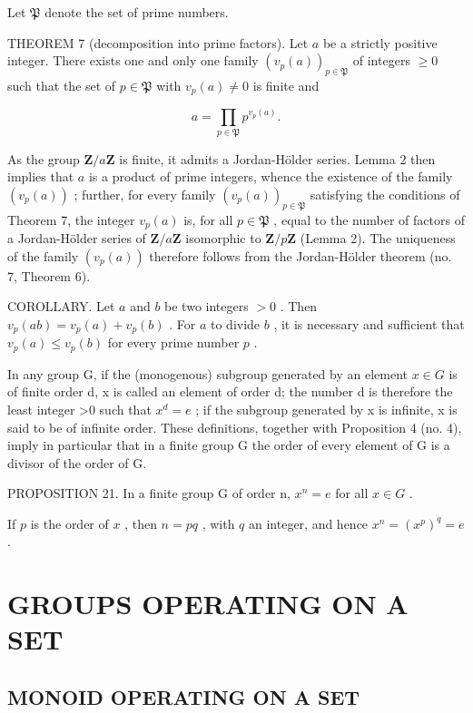 Let \(\mathfrak{P}\) denote the set of prime numbers.

THEOREM 7 (decomposition into prime factors). Let \(a\) be a strictly positive integer. There exists one and only one family \((v_{p}(a))_{p \in \mathfrak{P}}\) of integers \(\geqslant 0\) such that the set of \(p \in \mathfrak{P}\) with \(v_{p}(a) \neq 0\) is finite and

\[
a = \prod_ {p \in \mathfrak {P}} p ^ {v _ {p} (a)}.\tag{5}
\]

As the group \(\mathbf{Z}/a\mathbf{Z}\) is finite, it admits a Jordan-Hölder series. Lemma 2 then implies that \(a\) is a product of prime integers, whence the existence of the family \((v_{p}(a))\) ; further, for every family \((v_{p}(a))_{p\in\mathfrak{P}}\) satisfying the conditions of Theorem 7, the integer \(v_{p}(a)\) is, for all \(p\in\mathfrak{P}\) , equal to the number of factors of a Jordan-Hölder series of \(\mathbf{Z}/a\mathbf{Z}\) isomorphic to \(\mathbf{Z}/p\mathbf{Z}\) (Lemma 2). The uniqueness of the family \((v_{p}(a))\) therefore follows from the Jordan-Hölder theorem (no. 7, Theorem 6).

COROLLARY. Let \(a\) and \(b\) be two integers \(>0\) . Then \(v_{p}(ab) = v_{p}(a) + v_{p}(b)\) . For \(a\) to divide \(b\) , it is necessary and sufficient that \(v_{p}(a) \leqslant v_{p}(b)\) for every prime number \(p\) .

In any group G, if the (monogenous) subgroup generated by an element \(x \in G\) is of finite order d, x is called an element of order d; the number d is therefore the least integer \textgreater0 such that \(x^{d} = e\) ; if the subgroup generated by x is infinite, x is said to be of infinite order. These definitions, together with Proposition 4 (no. 4), imply in particular that in a finite group G the order of every element of G is a divisor of the order of G.

PROPOSITION 21. In a finite group G of order n, \(x^{n} = e\) for all \(x \in G\) .

If \(p\) is the order of \(x\) , then \(n = pq\) , with \(q\) an integer, and hence \(x^n = (x^p)^q = e\) .

\section{GROUPS OPERATING ON A SET}

\subsection{MONOID OPERATING ON A SET}

